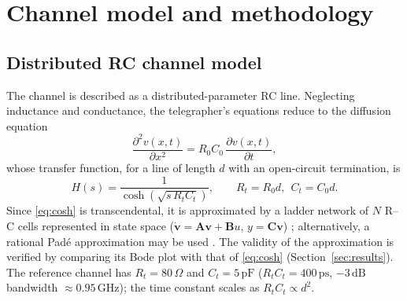 \documentclass[preprint,review,12pt]{elsarticle}
\begin{document}
\section{Channel model and methodology}
\label{sec:method}

\subsection{Distributed RC channel model}
The channel is described as a distributed-parameter RC line. Neglecting
inductance and conductance, the telegrapher's equations reduce to the
diffusion equation
\begin{equation}
\frac{\partial^2 v(x,t)}{\partial x^2} = R_0 C_0\,\frac{\partial v(x,t)}{\partial t},
\label{eq:difusion}
\end{equation}
whose transfer function, for a line of length $d$ with an open-circuit
termination, is
\begin{equation}
H(s) = \frac{1}{\cosh\!\left(\sqrt{s\,R_t C_t}\right)},\qquad R_t=R_0 d,\ \ C_t=C_0 d.
\label{eq:cosh}
\end{equation}
Since \eqref{eq:cosh} is transcendental, it is approximated by a ladder
network of $N$ R--C cells represented in state space
($\dot{\mathbf{v}}=\mathbf{A}\mathbf{v}+\mathbf{B}u$,
$y=\mathbf{C}\mathbf{v}$) \citep{5152908,5697500}; alternatively, a
rational Pad\'e approximation may be used \citep{554593}. The validity of
the approximation is verified by comparing its Bode plot with that of
\eqref{eq:cosh} (Section~\ref{sec:results}). The reference channel has
$R_t=80\,\Omega$ and $C_t=5\,\mathrm{pF}$ ($R_tC_t=400\,\mathrm{ps}$,
$-3\,\mathrm{dB}$ bandwidth $\approx 0.95\,\mathrm{GHz}$); the time
constant scales as $R_tC_t\propto d^2$.
\end{document}
